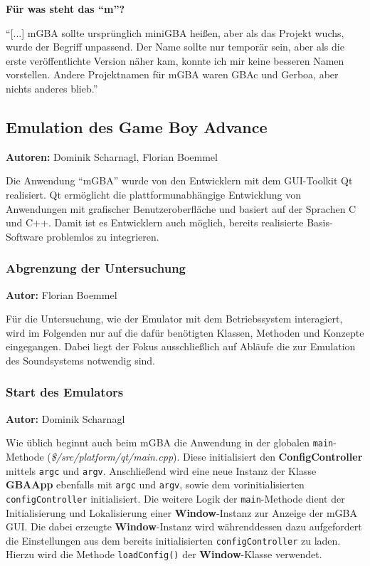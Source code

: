 \documentclass[11pt,a4paper]{scrartcl}
\newcommand{\AutorDominik} {
    \vspace{-4mm}
    \large \textbf{Autor:} Dominik Scharnagl \normalsize
    \vspace{2mm}
}
\newcommand{\AutorDominikFlorian} {
    \vspace{-4mm}
    \large \textbf{Autoren:} Dominik Scharnagl, Florian Boemmel \normalsize
    \vspace{2mm}
}
\newcommand{\AutorFlorian} {
    \vspace{-4mm}
    \large \textbf{Autor:} Florian Boemmel \normalsize
    \vspace{2mm}
}
\newcommand{\paratitle}[1] {
    \vspace{5mm}
    \large \textbf{#1} \normalsize
    \vspace{2mm}\newline
}
\begin{document}
\paratitle{F\"ur was steht das \enquote{m}?}
\enquote{[...] mGBA sollte urspr\"unglich miniGBA hei{\ss}en, aber als das Projekt wuchs, wurde der Begriff unpassend. Der Name sollte nur tempor\"ar sein, aber als die erste ver\"offentlichte Version n\"aher kam, konnte ich mir keine besseren Namen vorstellen. Andere Projektnamen f\"ur mGBA waren GBAc und Gerboa, aber nichts anderes blieb.} \cite{mGBAFaq}



\subsection{Emulation des Game Boy Advance} \label{EmulationGameBoyAdvance}
\AutorDominikFlorian

Die Anwendung \enquote{mGBA} wurde von den Entwicklern mit dem GUI-Toolkit Qt realisiert. Qt erm\"oglicht die plattformunabh\"angige Entwicklung von Anwendungen mit grafischer Benutzeroberfl\"ache und basiert auf der Sprachen C und C++. Damit ist es Entwicklern auch m\"oglich, bereits realisierte Basis-Software problemlos zu integrieren.


\subsubsection{Abgrenzung der Untersuchung}
\AutorFlorian

F\"ur die Untersuchung, wie der Emulator mit dem Betriebssystem interagiert, wird im Folgenden nur auf die daf\"ur ben\"otigten Klassen, Methoden und Konzepte eingegangen. Dabei liegt der Fokus ausschlie{\ss}lich auf Abl\"aufe die zur Emulation des Soundsystems notwendig sind.

\newpage
\subsubsection{Start des Emulators} \label{Emulator_Start}
\AutorDominik

Wie \"ublich beginnt auch beim mGBA die Anwendung in der globalen \verb|main|-Methode (\textit{\$/src/platform/qt/main.cpp}). Diese initialisiert den \textbf{ConfigController} mittels \verb|argc| und \verb|argv|. Anschlie{\ss}end wird eine neue Instanz der Klasse \textbf{GBAApp} ebenfalls mit \verb|argc| und \verb|argv|, sowie dem vorinitialisierten \verb|configController| initialisiert. Die weitere Logik der \verb|main|-Methode dient der Initialisierung und Lokalisierung einer \textbf{Window}-Instanz zur Anzeige der mGBA GUI. Die dabei erzeugte \textbf{Window}-Instanz wird w\"ahrenddessen dazu aufgefordert die Einstellungen aus dem bereits initialisierten \verb|configController| zu laden. Hierzu wird die Methode \verb|loadConfig()| der \textbf{Window}-Klasse verwendet.
\end{document}
